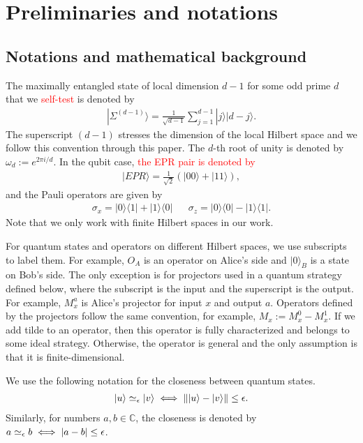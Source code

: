 \documentclass[11pt,letterpaper]{article}
\newcommand{\ket}[1]{|#1\rangle}
\newcommand{\ketbra}[2]{|#1\rangle\langle#2|}
\DeclarePairedDelimiter{\norm}{\lVert}{\rVert}
\DeclarePairedDelimiter{\cnorm}{\lvert}{\rvert}
\newcommand{\C}{\mathbb{C}}
\newcommand{\1}{\mathbb{1}}
\newcommand{\EPR}[1]{\Sigma^{(#1)}}
\newcommand{\paulix}{\sigma_x}
\newcommand{\pauliz}{\sigma_z}
\newcommand{\appd}[1]{\simeq_{#1}}
\newcommand{\hf}[1]{\textcolor{red}{#1}}
\theoremstyle{definition}
\begin{document}
\section{Preliminaries and notations}
\label{sec:prelim}
\subsection{Notations and mathematical background}
The maximally entangled state of local dimension $d-1$ for some odd prime $d$ that we \hf{self-test} is denoted by
\begin{align}
\ket{\EPR{d-1}} = \frac{1}{\sqrt{d-1}} \sum_{j = 1}^{d-1} \ket{j}\ket{d-j}.
\end{align}
The superscript $(d-1)$ stresses the dimension of the local Hilbert space and we follow this convention through this paper.
The $d$-th root of unity is denoted by $\omega_d:=e^{2\pi i/d}$. In the qubit case, 
\hf{the EPR pair is denoted by} 
\begin{align}
	\ket{EPR} = \frac{1}{\sqrt{2}}(\ket{00} + \ket{11}),
\end{align}
and the Pauli operators are given by
\begin{align}
	\paulix = \ketbra{0}{1}+\ketbra{1}{0} && \pauliz = \ketbra{0}{0} - \ketbra{1}{1}.
\end{align}
Note that we only work with finite Hilbert spaces in our work.

For quantum states and operators on different Hilbert spaces, we use subscripts to label them.
For example, $O_A$ is an operator on Alice's side and $\ket{0}_{B}$ is a state on Bob's side. 
The only exception is for projectors used in a quantum strategy defined below, where the subscript 
is the input and the superscript is the output. For example, $M_x^a$ is Alice's projector for input $x$ and output $a$.
Operators defined by the projectors follow the same convention, for example, $M_x := M_x^0 - M_x^1$.
If we add tilde to an operator, then this operator is fully characterized and belongs to some ideal strategy.
Otherwise, the operator is general and the only assumption is that it is finite-dimensional.

We use the following notation for the closeness between quantum states.
\begin{align}
	\ket{u} \appd{\epsilon} \ket{v} \iff \norm{\ket{u} - \ket{v}} \leq \epsilon. 
\end{align}
Similarly, for numbers $a,b \in \C$, the closeness is denoted by
$a \appd{\epsilon} b \iff \cnorm{a-b} \leq \epsilon$.
\end{document}
